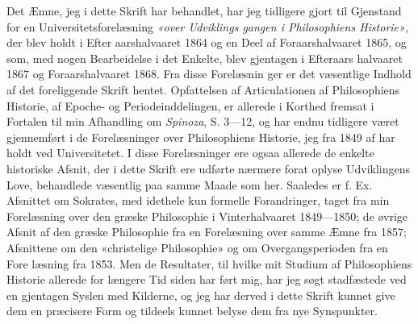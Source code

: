 {\small
Det Æmne, jeg i dette Skrift har behandlet, har jeg tidligere gjort
til Gjenstand for en Universitetsforelæsning \emph{«over Udviklings\-%
gangen i Philosophiens Historie»}, der blev holdt i Efter\-%
aarshalvaaret 1864 og en Deel af Foraarshalvaaret 1865, og som,
med nogen Bearbeidelse i det Enkelte, blev gjentagen i Efteraars\-%
halvaaret 1867 og Foraarshalvaaret 1868. Fra disse Forelæsnin\-%
ger er det væsentlige Indhold af det foreliggende Skrift hentet.
Opfattelsen af Articulationen af Philosophiens Historie, af Epoche-
og Periodeinddelingen, er allerede i Korthed fremsat i Fortalen til
min Afhandling om \emph{Spinoza}, S. 3---12, og har endnu tidligere
været gjennemført i de Forelæsninger over Philosophiens Historie,
jeg fra 1849 af har holdt ved Universitetet. I disse Forelæsninger
ere ogsaa allerede de enkelte historiske Afsnit, der i dette Skrift
ere udførte nærmere forat oplyse Udviklingens Love, behandlede
væsentlig paa samme Maade som her. Saaledes er f. Ex. Afsnittet
om Sokrates, med idethele kun formelle Forandringer, taget fra
min Forelæsning over den græske Philosophie i Vinterhalvaaret
1849---1850; de øvrige Afsnit af den græske Philosophie fra en
Forelæsning over samme Æmne fra 1857; Afsnittene om den
«christelige Philosophie» og om Overgangsperioden fra en Fore%
læsning fra 1853. Men de Resultater, til hvilke mit Studium af
Philosophiens Historie allerede for længere Tid siden har ført mig,
har jeg søgt stadfæstede ved en gjentagen Syslen med Kilderne, og
jeg har derved i dette Skrift kunnet give dem en præcisere Form
og tildeels kunnet belyse dem fra nye Synspunkter.

}
